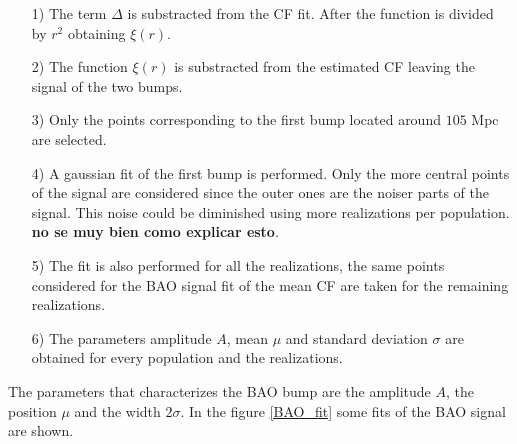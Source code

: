 \begin{itemize}

\item[1)] The term $\Delta$ is substracted from the CF fit. After the function
is divided by $r^2$ obtaining $\xi(r)$. 

\item[2)] The function $\xi(r)$ is substracted from the estimated CF leaving
the signal of the two bumps. 

\item[3)] Only the points corresponding to the first bump located around $105$ Mpc 
are selected. 

\item[4)] A gaussian fit of the first bump is performed. Only the more central points
of the signal are considered since the outer ones are the noiser parts of the signal. This noise 
could be diminished using more realizations per population. \textbf{no se muy bien como explicar esto}. 

\item[5)] The fit is also performed for all the realizations, the same points
considered for the BAO signal fit of the mean CF are taken for the remaining realizations. 

\item[6)] The parameters amplitude $A$, mean $\mu$ and standard deviation $\sigma$ are
obtained for every population and the realizations. 

\end{itemize}

The parameters that characterizes the BAO bump are the amplitude $A$, the position
$\mu$ and the width $2\sigma$. In the figure \ref{BAO_fit} some fits of the BAO
signal are shown. 

